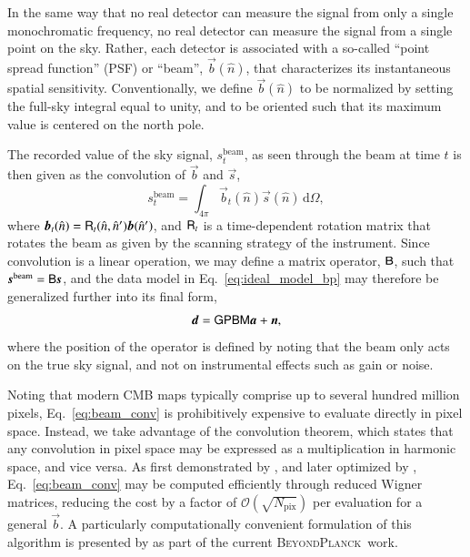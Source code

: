 \documentclass[onecolumn]{aa}
\renewcommand{\d}[0]{\vec{d}}
\newcommand{\n}[0]{\vec{n}}
\newcommand{\s}[0]{\vec{s}}
\renewcommand{\a}[0]{\vec{a}}
\newcommand{\B}[0]{\tens{B}}
\renewcommand{\b}[0]{\vec{b}}
\newcommand{\M}[0]{\tens{M}}
\renewcommand{\P}[0]{\tens{P}}
\newcommand{\R}[0]{\tens{R}}
\renewcommand{\G}[0]{\tens{G}}
\newcommand{\BP}{\textsc{BeyondPlanck}}
\begin{document}
In the same way that no real detector can measure the signal from only
a single monochromatic frequency, no real detector can measure the
signal from a single point on the sky. Rather, each detector is
associated with a so-called ``point spread function'' (PSF) or
``beam'', $\b(\hat{n})$, that characterizes its instantaneous spatial
sensitivity. Conventionally, we define $\b(\hat{n})$ to be normalized
by setting the full-sky integral equal to unity, and to be oriented such that
its maximum value is centered on the north pole.

The recorded value of the sky signal, $s^{\mathrm{beam}}_t$, as seen
through the beam at time $t$ is then given as the convolution of $\b$
and $\s$,
\begin{equation}
  s^{\mathrm{beam}}_t = \int_{4\pi} \b_t(\hat{n})\s(\hat{n})
  \,\mathrm d\Omega,
  \label{eq:beam_conv}
\end{equation}
where $\b_t(\hat{n})=\R_t(\hat{n},\hat{n}')\b(\hat{n}')$, and $\R_t$
is a time-dependent rotation matrix that rotates the beam as given by
the scanning strategy of the instrument. Since convolution is a linear
operation, we may define a matrix operator, $\B$, such that
$\s^{\mathrm{beam}} = \B\s$, and the data model in
Eq.~\eqref{eq:ideal_model_bp} may therefore be generalized further into
its final form,
\begin{equation}
  \d = \G\P\B\M\a + \n,
  \label{eq:ideal_model_final}
\end{equation}
where the position of the operator is defined by noting that the beam
only acts on the true sky signal, and not on instrumental effects such
as gain or noise.

Noting that modern CMB maps typically comprise up to several hundred
million pixels, Eq.~\eqref{eq:beam_conv} is prohibitively expensive to
evaluate directly in pixel space. Instead, we take advantage of the
convolution theorem, which states that any convolution in pixel space
may be expressed as a multiplication in harmonic space, and vice
versa. As first demonstrated by \citet{wandelt:2001}, and later
optimized by \citet{prezeau:2010}, Eq.~\eqref{eq:beam_conv} may be
computed efficiently through reduced Wigner matrices, reducing the
cost by a factor of $\mathcal{O}(\sqrt{N_{\mathrm{pix}}})$ per
evaluation for a general $\b$. A particularly computationally
convenient formulation of this algorithm is presented by \citet{bp08}
as part of the current \BP\ work.
\end{document}
